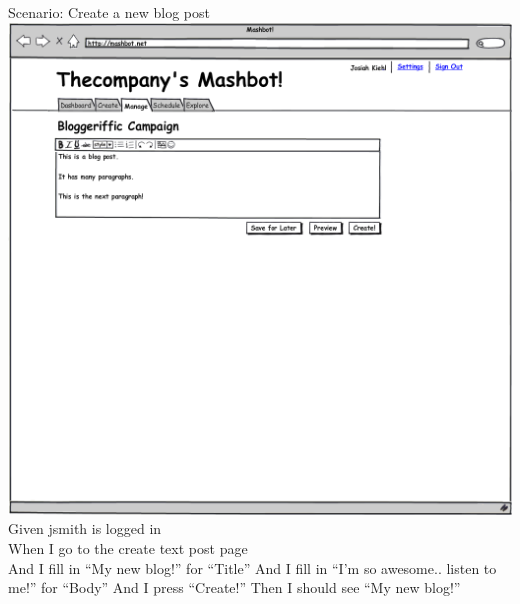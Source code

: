 \documentclass[12pt]{article}
\begin{document}
\begin{hangparas}{0.25in}{1}
Scenario: Create a new blog post \\
\includegraphics[width=\textwidth]{../mockups/manage-create-blog-post.png}
  Given jsmith is logged in \\
  When I go to the create text post page \\
  And I fill in ``My new blog!'' for ``Title''
  And I fill in ``I'm so awesome.. listen to me!'' for ``Body'' 
  And I press ``Create!'' 
  Then I should see ``My new blog!'' 
  

\end{hangparas}
\end{document}
